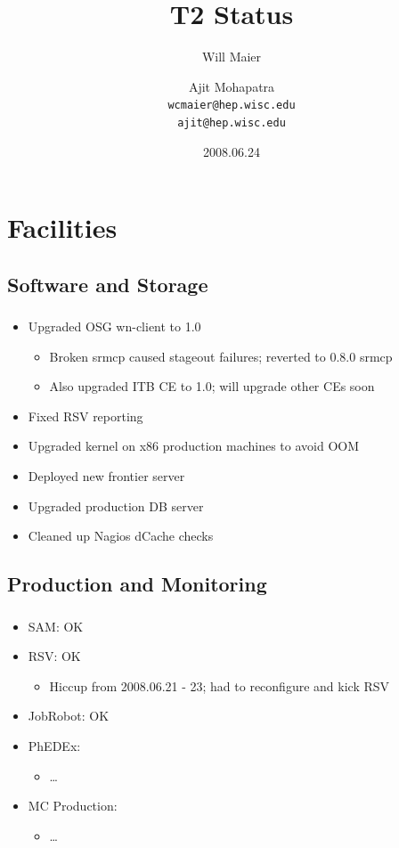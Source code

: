 \documentclass{beamer}
\title{T2 Status}
\author[Maier, Mohapatra]{
    Will Maier \and Ajit Mohapatra\\ 
    {\tt wcmaier@hep.wisc.edu}\\
    {\tt ajit@hep.wisc.edu}}
\institute[Wisconsin]{University of Wisconsin - High Energy Physics}
\date{2008.06.24}
\begin{document}
\begin{frame}
    \titlepage
\end{frame}


\section{Facilities}
\subsection{Software and Storage}
\begin{frame}
\frametitle{}
\begin{itemize}
    \item Upgraded OSG wn-client to 1.0
    \begin{itemize}
        \item Broken srmcp caused stageout failures; reverted to 0.8.0 srmcp
        \item Also upgraded ITB CE to 1.0; will upgrade other CEs soon
    \end{itemize}
    \item Fixed RSV reporting
    \item Upgraded kernel on x86 production machines to avoid OOM
    \item Deployed new frontier server
    \item Upgraded production DB server
    \item Cleaned up Nagios dCache checks
\end{itemize}
\end{frame}

\subsection{Production and Monitoring}
\begin{frame}
\frametitle{}
\begin{itemize}
    \item SAM: OK
    \item RSV: OK
    \begin{itemize}
        \item Hiccup from 2008.06.21 - 23; had to reconfigure and kick RSV
    \end{itemize}
    \item JobRobot: OK 
    \item PhEDEx:
    \begin{itemize}
        \item \ldots{}
    \end{itemize}
    \item MC Production:
    \begin{itemize}
        \item \ldots{}
    \end{itemize}
\end{itemize}
\end{frame}
\end{document}
